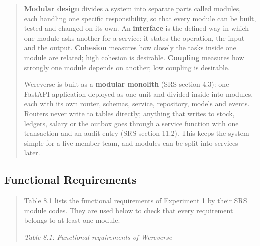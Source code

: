 \documentclass[12pt,a4paper]{article}
\begin{document}
\begin{quote}
\textbf{Modular design} divides a system into separate parts called
modules, each handling one specific responsibility, so that every module
can be built, tested and changed on its own. An \textbf{interface} is
the defined way in which one module asks another for a service: it
states the operation, the input and the output. \textbf{Cohesion}
measures how closely the tasks inside one module are related; high
cohesion is desirable. \textbf{Coupling} measures how strongly one
module depends on another; low coupling is desirable.

Wereverse is built as a \textbf{modular monolith} (SRS section 4.3): one
FastAPI application deployed as one unit and divided inside into
modules, each with its own router, schemas, service, repository, models
and events. Routers never write to tables directly; anything that writes
to stock, ledgers, salary or the outbox goes through a service function
with one transaction and an audit entry (SRS section 11.2). This keeps
the system simple for a five-member team, and modules can be split into
services later.
\end{quote}

\subsection{Functional Requirements}\label{functional-requirements-1}

\begin{quote}
Table 8.1 lists the functional requirements of Experiment 1 by their SRS
module codes. They are used below to check that every requirement
belongs to at least one module.

\emph{Table 8.1: Functional requirements of Wereverse}
\end{quote}
\end{document}
